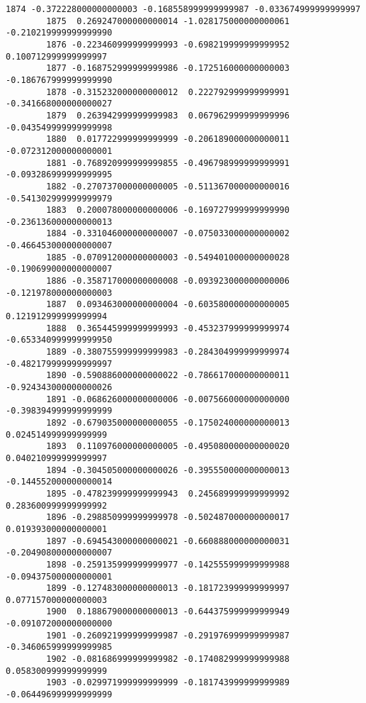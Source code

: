 \documentclass[11pt]{article}
\begin{document}
\begin{Verbatim}[commandchars=\\\{\}]
        1874 -0.372228000000000003 -0.168558999999999987 -0.033674999999999997   
        1875  0.269247000000000014 -1.028175000000000061 -0.210219999999999990   
        1876 -0.223460999999999993 -0.698219999999999952  0.100712999999999997   
        1877 -0.168752999999999986 -0.172516000000000003 -0.186767999999999990   
        1878 -0.315232000000000012  0.222792999999999991 -0.341668000000000027   
        1879  0.263942999999999983  0.067962999999999996 -0.043549999999999998   
        1880  0.017722999999999999 -0.206189000000000011 -0.072312000000000001   
        1881 -0.768920999999999855 -0.496798999999999991 -0.093286999999999995   
        1882 -0.270737000000000005 -0.511367000000000016 -0.541302999999999979   
        1883  0.200078000000000006 -0.169727999999999990 -0.236136000000000013   
        1884 -0.331046000000000007 -0.075033000000000002 -0.466453000000000007   
        1885 -0.070912000000000003 -0.549401000000000028 -0.190699000000000007   
        1886 -0.358717000000000008 -0.093923000000000006 -0.121978000000000003   
        1887  0.093463000000000004 -0.603580000000000005  0.121912999999999994   
        1888  0.365445999999999993 -0.453237999999999974 -0.653340999999999950   
        1889 -0.380755999999999983 -0.284304999999999974 -0.482179999999999997   
        1890 -0.590886000000000022 -0.786617000000000011 -0.924343000000000026   
        1891 -0.068626000000000006 -0.007566000000000000 -0.398394999999999999   
        1892 -0.679035000000000055 -0.175024000000000013  0.024514999999999999   
        1893  0.110976000000000005 -0.495080000000000020  0.040210999999999997   
        1894 -0.304505000000000026 -0.395550000000000013 -0.144552000000000014   
        1895 -0.478239999999999943  0.245689999999999992  0.283600999999999992   
        1896 -0.298850999999999978 -0.502487000000000017  0.019393000000000001   
        1897 -0.694543000000000021 -0.660888000000000031 -0.204908000000000007   
        1898 -0.259135999999999977 -0.142555999999999988 -0.094375000000000001   
        1899 -0.127483000000000013 -0.181723999999999997  0.077157000000000003   
        1900  0.188679000000000013 -0.644375999999999949 -0.091072000000000000   
        1901 -0.260921999999999987 -0.291976999999999987 -0.346065999999999985   
        1902 -0.081686999999999982 -0.174082999999999988  0.058300999999999999   
        1903 -0.029971999999999999 -0.181743999999999989 -0.064496999999999999   
        

\end{Verbatim}
\end{document}
